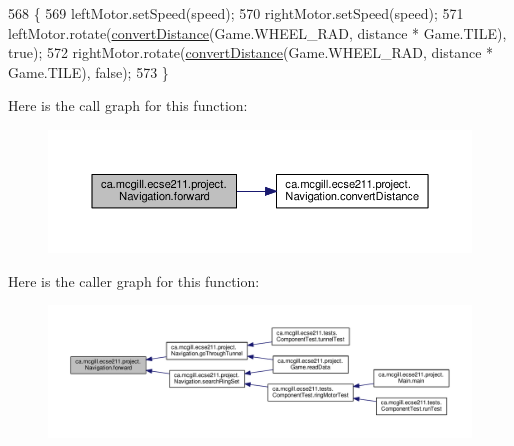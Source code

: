 \begin{DoxyCode}
568                                                   \{
569     leftMotor.setSpeed(speed);
570     rightMotor.setSpeed(speed);
571     leftMotor.rotate(\hyperlink{classca_1_1mcgill_1_1ecse211_1_1project_1_1_navigation_ac9e260bcd619ffa4820d7d0de7ea1c12}{convertDistance}(Game.WHEEL\_RAD, distance * Game.TILE), \textcolor{keyword}{true});
572     rightMotor.rotate(\hyperlink{classca_1_1mcgill_1_1ecse211_1_1project_1_1_navigation_ac9e260bcd619ffa4820d7d0de7ea1c12}{convertDistance}(Game.WHEEL\_RAD, distance * Game.TILE), \textcolor{keyword}{false});
573   \}
\end{DoxyCode}
Here is the call graph for this function\+:
\nopagebreak
\begin{figure}[H]
\begin{center}
\leavevmode
\includegraphics[width=350pt]{classca_1_1mcgill_1_1ecse211_1_1project_1_1_navigation_a7c66610c5b7496ddb35d342ab2cd3f08_cgraph}
\end{center}
\end{figure}
Here is the caller graph for this function\+:
\nopagebreak
\begin{figure}[H]
\begin{center}
\leavevmode
\includegraphics[width=350pt]{classca_1_1mcgill_1_1ecse211_1_1project_1_1_navigation_a7c66610c5b7496ddb35d342ab2cd3f08_icgraph}
\end{center}
\end{figure}
\mbox{\label{classca_1_1mcgill_1_1ecse211_1_1project_1_1_navigation_a4b52e605d3ea2f9bcd9481ae2c69ba39}} 
